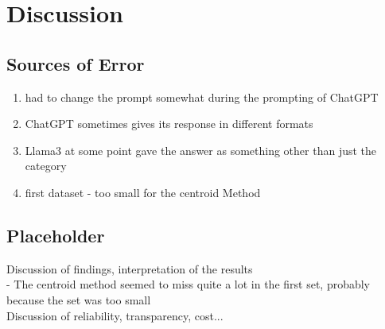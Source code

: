 \section*{Discussion}
\subsection*{Sources of Error}
\begin{enumerate}
    \item had to change the prompt somewhat during the prompting of ChatGPT
    \item ChatGPT sometimes gives its response in different formats
    \item Llama3 at some point gave the answer as something other than just the category
    \item first dataset - too small for the centroid Method
\end{enumerate}

\subsection*{Placeholder}
Discussion of findings, interpretation of the results\\
- The centroid method seemed to miss quite a lot in the first set, probably because the set was too small\\

Discussion of reliability, transparency, cost...
